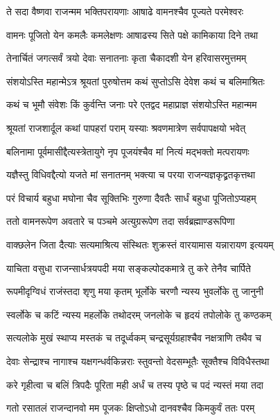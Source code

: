 \twolineshloka
{ते सदा वैष्णवा राजन्मम भक्तिपरायणाः}
{आषाढे वामनश्चैव पूज्यते परमेश्वरः}%

\twolineshloka
{वामनः पूजितो येन कमलैः कमलेक्षणः}
{आषाढस्य सिते पक्षे कामिकाया दिने तथा}%

\twolineshloka
{तेनार्चितं जगत्सर्वं त्रयो देवाः सनातनाः}
{कृता चैकादशी येन हरिवासरमुत्तमम्}%


\twolineshloka
{संशयोऽस्ति महान्मेऽत्र श्रूयतां पुरुषोत्तम}
{कथं सुप्तोऽसि देवेश कथं च बलिमाश्रितः}%

\twolineshloka
{कथं च भूमौ संवेशः किं कुर्वन्ति जनाः परे}
{एतद्वद महाप्राज्ञ संशयोऽस्ति महान्मम}%


\twolineshloka
{श्रूयतां राजशार्दूल कथां पापहरां पराम्}
{यस्याः श्रवणमात्रेण सर्वपापक्षयो भवेत्}%

\twolineshloka
{बलिनामा पूर्वमासीद्दैत्यस्त्रेतायुगे नृप}
{पूजयंश्चैव मां नित्यं मद्भक्तो मत्परायणः}%

\twolineshloka
{यज्ञैस्तु विधिवद्दैत्यो यजते मां सनातनम्}
{भक्त्या च परया राजन्यज्ञकृद्व्रतकृत्तथा}%

\twolineshloka
{परं विचार्य बहुधा मघोना चैव सूक्तिभिः}
{गुरुणा दैवतैः सार्धं बहुधा पूजितोऽप्यहम्}%

\twolineshloka
{ततो वामनरूपेण अवतारे च पञ्चमे}
{अत्युग्ररूपेण तदा सर्वब्रह्माण्डरूपिणा}%

\twolineshloka
{वाक्छलेन जिता दैत्याः सत्यमाश्रित्य संस्थितः}
{शुक्रस्तं वारयामास यन्नारायण इत्ययम्}%

\twolineshloka
{याचिता वसुधा राजन्सार्धत्रयपदी मया}
{सङ्कल्पोदकमात्रे तु करे तेनैव चार्पिते}%

\twolineshloka
{रूपमीदृग्विधं राजंस्तदा शृणु मया कृतम्}
{भूर्लोके चरणौ न्यस्य भुवर्लोके तु जानुनी}%

\twolineshloka
{स्वर्लोके च कटिं न्यस्य महर्लोके तथोदरम्}
{जनलोके च हृदयं तपोलोके तु कण्ठकम्}%

\twolineshloka
{सत्यलोके मुखं स्थाप्य मस्तकं च तदूर्ध्वकम्}
{चन्द्रसूर्यग्रहाश्चैव नक्षत्राणि तथैव च}%

\twolineshloka
{देवाः सेन्द्राश्च नागाश्च यक्षगन्धर्वकिन्नराः}
{स्तुवन्तो वेदसम्भूतैः सूक्तैश्च विविधैस्तथा}%

\twolineshloka
{करे गृहीत्वा च बलिं त्रिपदैः पूरिता मही}
{अर्धं च तस्य पृष्ठे च पदं न्यस्तं मया तदा}%

\twolineshloka
{गतो रसातलं राजन्दानवो मम पूजकः}
{क्षिप्तोऽधो दानवश्चैव किमकुर्वं ततः परम्}%

